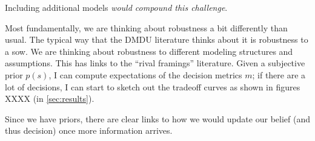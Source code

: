 \documentclass[12pt]{article}
\makeatletter
\DeclareRobustCommand\onedot{\futurelet\@let@token\@onedot}
\def\@onedot{\ifx\@let@token.\else.\null\fi\xspace}
\def\eg{\emph{e.g}\onedot} \def\Eg{\emph{E.g}\onedot}
\DeclareRobustCommand\onedot{\futurelet\@let@token\@onedot}
\def\@onedot{\ifx\@let@token.\else.\null\fi\xspace}
\def\eg{\emph{e.g}\onedot} \def\Eg{\emph{E.g}\onedot}
\makeatother
\begin{document}
Including additional models \citep[\eg,][]{kopp_evolving:2017,deconto_antarctica:2016,ruckert_coastal:2019} \emph{would compound this challenge}.

Most fundamentally, we are thinking about robustness a bit differently than usual.
The typical way that the DMDU literature thinks about it is robustness to a \gls{sow}.
We are thinking about robustness to different modeling structures and assumptions.
This has links to the ``rival framings'' literature.
Given a subjective prior $p(s)$, I can compute expectations of the decision metrics $m$; if there are a lot of decisions, I can start to sketch out the tradeoff curves as shown in figures XXXX (in \cref{sec:results}).

Since we have priors, there are clear links to how we would update our belief (and thus decision) once more information arrives.
\end{document}
